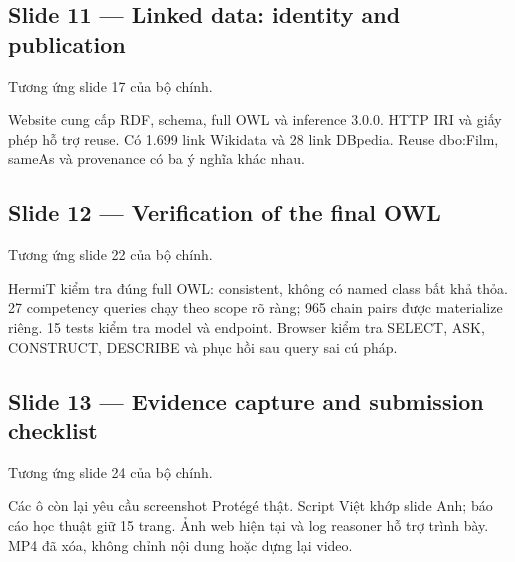 \documentclass[
  11pt,
]{article}
\begin{document}
\subsection{Slide 11 --- Linked data: identity and
publication}\label{slide-11-linked-data-identity-and-publication}

Tương ứng slide 17 của bộ chính.

Website cung cấp RDF, schema, full OWL và inference 3.0.0. HTTP IRI và
giấy phép hỗ trợ reuse. Có 1.699 link Wikidata và 28 link DBpedia. Reuse
dbo:Film, sameAs và provenance có ba ý nghĩa khác nhau.

\subsection{Slide 12 --- Verification of the final
OWL}\label{slide-12-verification-of-the-final-owl}

Tương ứng slide 22 của bộ chính.

HermiT kiểm tra đúng full OWL: consistent, không có named class bất khả
thỏa. 27 competency queries chạy theo scope rõ ràng; 965 chain pairs
được materialize riêng. 15 tests kiểm tra model và endpoint. Browser
kiểm tra SELECT, ASK, CONSTRUCT, DESCRIBE và phục hồi sau query sai cú
pháp.

\subsection{Slide 13 --- Evidence capture and submission
checklist}\label{slide-13-evidence-capture-and-submission-checklist}

Tương ứng slide 24 của bộ chính.

Các ô còn lại yêu cầu screenshot Protégé thật. Script Việt khớp slide
Anh; báo cáo học thuật giữ 15 trang. Ảnh web hiện tại và log reasoner hỗ
trợ trình bày. MP4 đã xóa, không chỉnh nội dung hoặc dựng lại video.
\end{document}
